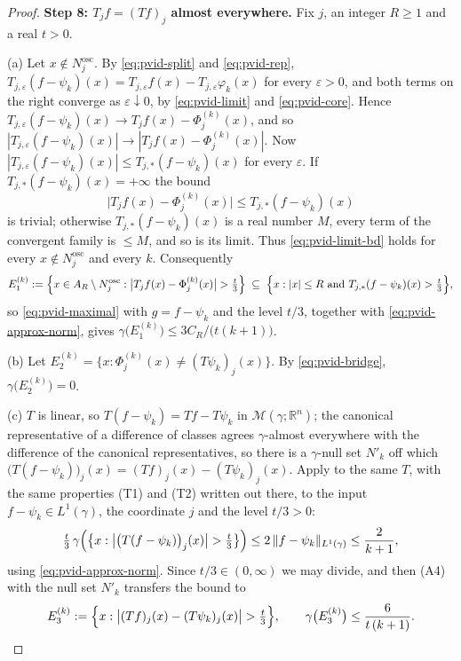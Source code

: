 \begin{proof}
\medskip
\noindent\textbf{Step 8: $T_jf = (Tf)_j$ almost everywhere.}
Fix $j$, an integer $R \geq 1$ and a real $t > 0$.

(a) Let $x \notin N_j^{\mathrm{osc}}$.  By \eqref{eq:pvid-split} and
\eqref{eq:pvid-rep}, $T_{j,\varepsilon}(f-\psi_k)(x)
 = T_{j,\varepsilon}f(x) - T_{j,\varepsilon}\varphi_k(x)$ for every
$\varepsilon > 0$, and both terms on the right converge as
$\varepsilon\downarrow0$, by \eqref{eq:pvid-limit} and \eqref{eq:pvid-core}.
Hence
$T_{j,\varepsilon}(f-\psi_k)(x) \to T_jf(x) - \Phi^{(k)}_j(x)$, and so
$|T_{j,\varepsilon}(f-\psi_k)(x)| \to |T_jf(x) - \Phi^{(k)}_j(x)|$.  Now
$|T_{j,\varepsilon}(f-\psi_k)(x)| \leq T_{j,*}(f-\psi_k)(x)$ for every
$\varepsilon$.  If $T_{j,*}(f-\psi_k)(x) = +\infty$ the bound
\begin{equation}\label{eq:pvid-limit-bd}
  \bigl|T_jf(x) - \Phi^{(k)}_j(x)\bigr| \leq T_{j,*}(f-\psi_k)(x)
\end{equation}
is trivial; otherwise $T_{j,*}(f-\psi_k)(x)$ is a real number $M$, every term
of the convergent family is $\leq M$, and so is its limit.  Thus
\eqref{eq:pvid-limit-bd} holds for every $x \notin N_j^{\mathrm{osc}}$ and
every $k$.  Consequently
\[
  E^{(k)}_1 := \Bigl\{x \in A_R\setminus N_j^{\mathrm{osc}} :
     \bigl|T_jf(x) - \Phi^{(k)}_j(x)\bigr| > \tfrac t3\Bigr\}
  \;\subseteq\;
  \Bigl\{x : |x| \leq R \text{ and } T_{j,*}(f-\psi_k)(x) > \tfrac t3\Bigr\} ,
\]
so \eqref{eq:pvid-maximal} with $g = f-\psi_k$ and the level $t/3$, together
with \eqref{eq:pvid-approx-norm}, gives
$\gamma\bigl(E^{(k)}_1\bigr) \leq 3C_R/\bigl(t(k+1)\bigr)$.

(b) Let $E^{(k)}_2 = \{x : \Phi^{(k)}_j(x) \neq (T\psi_k)_j(x)\}$.  By
\eqref{eq:pvid-bridge}, $\gamma\bigl(E^{(k)}_2\bigr) = 0$.

(c) $T$ is linear, so $T(f - \psi_k) = Tf - T\psi_k$ in
$\mathcal{M}(\gamma;\mathbb{R}^n)$; the canonical representative of a
difference of classes agrees $\gamma$-almost everywhere with the difference of
the canonical representatives, so there is a $\gamma$-null set $N'_k$ off which
$\bigl(T(f-\psi_k)\bigr)_j(x) = (Tf)_j(x) - (T\psi_k)_j(x)$.  Apply
 to the same $T$, with the same properties
(T1) and (T2) written out there, to the input $f - \psi_k \in L^1(\gamma)$, the
coordinate $j$ and the level $t/3 > 0$:
\[
  \tfrac t3\,\gamma\Bigl(\bigl\{x :
      \bigl|\bigl(T(f-\psi_k)\bigr)_j(x)\bigr| > \tfrac t3\bigr\}\Bigr)
  \leq 2\,\|f-\psi_k\|_{L^1(\gamma)} \leq \frac2{k+1} ,
\]
using \eqref{eq:pvid-approx-norm}.  Since $t/3 \in (0,\infty)$ we may divide,
and then (A4) with the null set $N'_k$ transfers the bound to
\[
  E^{(k)}_3 := \Bigl\{x : \bigl|(Tf)_j(x) - (T\psi_k)_j(x)\bigr|
     > \tfrac t3\Bigr\} ,
  \qquad
  \gamma\bigl(E^{(k)}_3\bigr) \leq \frac{6}{t\,(k+1)} .
\]


\end{proof}
